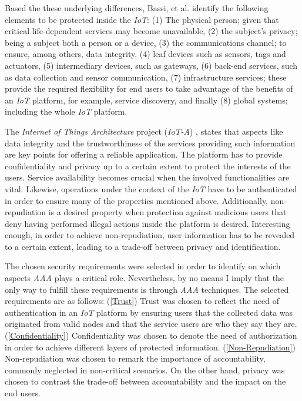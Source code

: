 \documentclass[journal]{IEEEtran}
\begin{document}
  Based the these underlying differences, Bassi, et al. \cite{Bassi2013} identify the following elements to be protected inside the \emph{IoT}: (1) The physical person; given that critical life-dependent services may become unavailable, (2) the subject's privacy; being a subject both a person or a device, (3) the communications channel; to ensure, among others, data integrity, (4) leaf devices such as sensors, tags and actuators, (5) intermediary devices, such as gateways, (6) back-end services, such as data collection and sensor communication, (7) infrastructure services; these provide the required flexibility for end users to take advantage of the benefits of an \emph{IoT} platform, for example, service discovery, and finally (8) global systems; including the whole \emph{IoT} platform.

  The \emph{Internet of Things Architecture} project (\emph{IoT-A}) \cite{Salinas2013}, states that aspects like data integrity and the trustworthiness of the services providing such information are key points for offering a reliable application. The platform has to provide confidentiality and privacy up to a certain extent to protect the interests of the users. Service availability becomes crucial when the involved functionalities are vital. Likewise, operations under the context of the \emph{IoT} have to be authenticated in order to ensure many of the properties mentioned above. Additionally, non-repudiation is a desired property when protection against malicious users that deny having performed illegal actions inside the platform is desired. Interesting enough, in order to achieve non-repudiation, user information has to be revealed to a certain extent, leading to a trade-off between privacy and identification.

  The chosen security requirements were selected in order to identify on which aspects \emph{AAA} plays a critical role. Nevertheless, by no means I imply that the only way to fulfill these requirements is through \emph{AAA} techniques. The selected requirements are as follows: (\ref{Trust}) Trust was chosen to reflect the need of authentication in an \emph{IoT} platform by ensuring users that the collected data was originated from valid nodes and that the service users are who they say they are. (\ref{Confidentiality}) Confidentiality was chosen to denote the need of authorization in order to achieve different layers of protected information. (\ref{Non-Repudiation}) Non-repudiation was chosen to remark the importance of accountability, commonly neglected in non-critical scenarios. On the other hand, privacy was chosen to contrast the trade-off between accountability and the impact on the end users.
\end{document}
